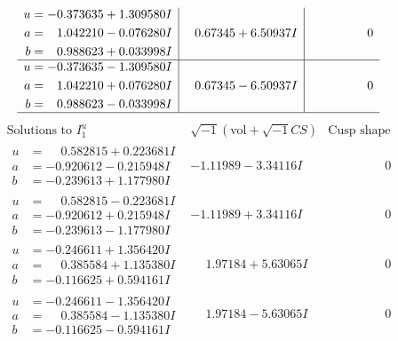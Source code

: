\documentclass[1p]{elsarticle_modified}
\theoremstyle{definition}
\newcommand{\I}{\sqrt{-1}}
\begin{document}
$$\begin{array}{c|c|c}
\begin{aligned}
u &= -0.373635 + 1.309580 I \\
a &= \phantom{-}1.042210 - 0.076280 I \\
b &= \phantom{-}0.988623 + 0.033998 I\end{aligned}
 & \phantom{-}0.67345 + 6.50937 I & \phantom{-0.000000 } 0 \\ \hline\begin{aligned}
u &= -0.373635 - 1.309580 I \\
a &= \phantom{-}1.042210 + 0.076280 I \\
b &= \phantom{-}0.988623 - 0.033998 I\end{aligned}
 & \phantom{-}0.67345 - 6.50937 I & \phantom{-0.000000 } 0\\
 \hline 
 \end{array}$$\newpage$$\begin{array}{c|c|c}  
\text{Solutions to }I^u_{1}& \I (\text{vol} + \sqrt{-1}CS) & \text{Cusp shape}\\
 \hline 
\begin{aligned}
u &= \phantom{-}0.582815 + 0.223681 I \\
a &= -0.920612 - 0.215948 I \\
b &= -0.239613 + 1.177980 I\end{aligned}
 & -1.11989 - 3.34116 I & \phantom{-0.000000 } 0 \\ \hline\begin{aligned}
u &= \phantom{-}0.582815 - 0.223681 I \\
a &= -0.920612 + 0.215948 I \\
b &= -0.239613 - 1.177980 I\end{aligned}
 & -1.11989 + 3.34116 I & \phantom{-0.000000 } 0 \\ \hline\begin{aligned}
u &= -0.246611 + 1.356420 I \\
a &= \phantom{-}0.385584 + 1.135380 I \\
b &= -0.116625 + 0.594161 I\end{aligned}
 & \phantom{-}1.97184 + 5.63065 I & \phantom{-0.000000 } 0 \\ \hline\begin{aligned}
u &= -0.246611 - 1.356420 I \\
a &= \phantom{-}0.385584 - 1.135380 I \\
b &= -0.116625 - 0.594161 I\end{aligned}
 & \phantom{-}1.97184 - 5.63065 I & \phantom{-0.000000 } 0 \\ \hline\begin{aligned}

\end{aligned}
\end{array}$$
\end{document}
